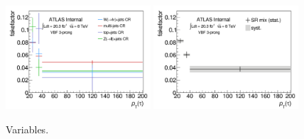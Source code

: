 \begin{figure}[tp]
  \centering
  \includegraphics[width=0.48\textwidth]{figures/backgrounds/fakefactor_8TeV_vbf_3p_CRs}
  \includegraphics[width=0.48\textwidth]{figures/backgrounds/fakefactor_8TeV_vbf_3p_mix}
  \caption{Variables.}
  \label{fig:backgrounds-fakefactorsVBF3p}
\end{figure}

\clearpage

